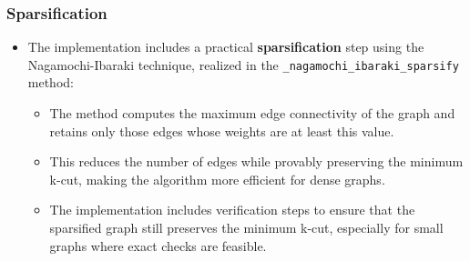 \documentclass[11pt]{article}
\begin{document}
\subsubsection{Sparsification}
\begin{itemize}
    \item The implementation includes a practical \textbf{sparsification} step using the Nagamochi-Ibaraki technique, realized in the \texttt{\_nagamochi\_ibaraki\_sparsify} method:
    \begin{itemize}
        \item The method computes the maximum edge connectivity of the graph and retains only those edges whose weights are at least this value.
        \item This reduces the number of edges while provably preserving the minimum k-cut, making the algorithm more efficient for dense graphs.
        \item The implementation includes verification steps to ensure that the sparsified graph still preserves the minimum k-cut, especially for small graphs where exact checks are feasible.
    \end{itemize}
\end{itemize}
\end{document}
